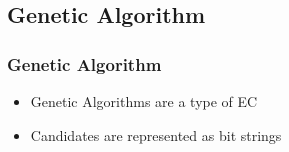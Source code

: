 \documentclass{beamer}
\begin{document}
\subsection{Genetic Algorithm}
\begin{frame}
  \frametitle{Genetic Algorithm}
\begin{itemize}
  \item Genetic Algorithms are a type of EC
  \item Candidates are represented as bit strings
\end{itemize}
\end{frame}

%
\end{document}

